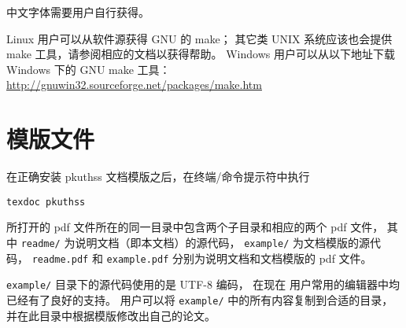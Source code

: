中文字体需要用户自行获得。

Linux 用户可以从软件源获得 GNU 的 make；
其它类 UNIX 系统应该也会提供 make 工具，请参阅相应的文档以获得帮助。%
Windows 用户可以从以下地址下载 Windows 下的 GNU make 工具：\\
\hspace*{\parindent}%
\url{http://gnuwin32.sourceforge.net/packages/make.htm}

\section{模版文件}\label{sec:doc-dir}

在正确安装 pkuthss 文档模版之后，在终端/命令提示符中执行
\begin{Verbatim}[frame = single]
texdoc pkuthss
\end{Verbatim}
所打开的 pdf 文件所在的同一目录中包含两个子目录和相应的两个 pdf 文件，
其中 \verb|readme/| 为说明文档（即本文档）的源代码，%
\verb|example/| 为文档模版的源代码，%
\verb|readme.pdf| 和 \verb|example.pdf|
分别为说明文档和文档模版的 pdf 文件。

\verb|example/| 目录下的源代码使用的是 UTF-8 编码，
在现在  用户常用的编辑器中均已经有了良好的支持。
用户可以将 \verb|example/| 中的所有内容复制到合适的目录，
并在此目录中根据模版修改出自己的论文。


